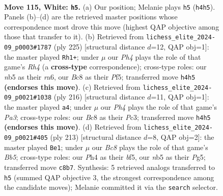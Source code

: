 \documentclass[11pt]{article}
\begin{document}
\clearpage

\begin{figure}[p]\centering
\begin{subfigure}{0.46\textwidth}\centering
\resizebox{\linewidth}{!}{%
\newchessgame
\chessboard[
  setfen={2B5/6k1/8/1n4P1/6KP/8/8/8 w - - 2 115},
  showmover=false,
  pgfstyle=straightmove, color=movearrow, markmove={h4-h5}
]}
\caption{}
\end{subfigure}\hfill
\begin{subfigure}{0.46\textwidth}\centering
\resizebox{\linewidth}{!}{%
\newchessgame
\chessboard[
  setfen={8/8/R7/5p1r/5k2/5p2/8/5K2 b - - 83 113},
  showmover=false,
  pgfstyle=straightmove, color=movearrow, markmove={h5-h1}
]}
\caption{}
\end{subfigure}
\\[4pt]
\begin{subfigure}{0.46\textwidth}\centering
\resizebox{\linewidth}{!}{%
\newchessgame
\chessboard[
  setfen={8/8/3k4/8/1PK5/P1P5/8/8 w - - 1 109},
  showmover=false,
  pgfstyle=straightmove, color=movearrow, markmove={a3-a4}
]}
\caption{}
\end{subfigure}\hfill
\begin{subfigure}{0.46\textwidth}\centering
\resizebox{\linewidth}{!}{%
\newchessgame
\chessboard[
  setfen={8/4k3/5p2/3K1Bp1/1b6/8/8/8 b - - 21 107},
  showmover=false,
  pgfstyle=straightmove, color=movearrow, markmove={b4-e1}
]}
\caption{}
\end{subfigure}
\caption{\textbf{Move 115, White: \texttt{h5}.} (a) Our position; Melanie plays \texttt{h5} (\texttt{h4h5}). Panels (b)--(d) are the retrieved master positions whose correspondence most drove this move (highest QAP objective among those that transfer to it). (b) Retrieved from \texttt{lichess\_elite\_2024-09\_p0003\#1787} (ply 225) [structural distance $d$=12, QAP obj=1]: the master played \texttt{Rh1+}; under $\mu$ our \emph{Ph4} plays the role of that game's \emph{Rh4} (a \textbf{cross-type} correspondence); cross-type roles: our \emph{n}b5 as their \emph{r}a6, our \emph{B}c8 as their \emph{P}f5; transferred move \texttt{h4h5} \textbf{(endorses this move)}. (c) Retrieved from \texttt{lichess\_elite\_2024-09\_p0021\#1038} (ply 216) [structural distance $d$=11, QAP obj=1]: the master played \texttt{a4}; under $\mu$ our \emph{Ph4} plays the role of that game's \emph{Pa3}; cross-type roles: our \emph{B}c8 as their \emph{P}c3; transferred move \texttt{h4h5} \textbf{(endorses this move)}. (d) Retrieved from \texttt{lichess\_elite\_2024-09\_p0021\#405} (ply 213) [structural distance $d$=8, QAP obj=2]: the master played \texttt{Be1}; under $\mu$ our \emph{Bc8} plays the role of that game's \emph{Bb5}; cross-type roles: our \emph{P}h4 as their \emph{b}f5, our \emph{n}b5 as their \emph{P}g5; transferred move \texttt{c8b7}. Synthesis: 5 retrieved analogs transferred to \texttt{h5} (summed QAP objective 3, the strongest correspondence among the candidate moves); Melanie committed it via the \texttt{search} selector.}
\label{fig:thought-m228}
\end{figure}
\end{document}
